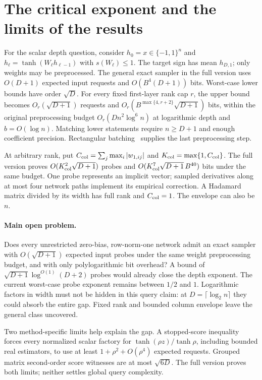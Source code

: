 \documentclass[11pt]{article}
\theoremstyle{definition}\newtheorem{definition}[theorem]{Definition}
\theoremstyle{remark}\newtheorem{remark}[theorem]{Remark}
\numberwithin{equation}{section}
\begin{document}


\section{The critical exponent and the limits of the results}
\label{sec:conf-open}

For the scalar depth question, consider
$h_0=x\in\{-1,1\}^n$ and $h_\ell=\tanh(W_\ell h_{\ell-1})$
with $s(W_\ell)\le1$. The target sign has mean $h_{D,1}$; only weights
may be preprocessed. The general exact sampler in
the full version uses $O(D+1)$ expected input requests and
$O(B^4(D+1))$ bits. Worst-case lower bounds have order $\sqrt D$.
For every fixed first-layer rank cap $r$, the upper bound becomes
$O_r(\sqrt{D+1})$ requests and
$O_r(B^{\max\{4,r+2\}}\sqrt{D+1})$ bits, within the
original preprocessing budget $O_r(Dn^2\log^6 n)$ at logarithmic depth
and $b=O(\log n)$. Matching lower statements require
$n\ge D+1$ and enough coefficient precision.
Rectangular batching~\cite{legall2012rect} supplies the last
preprocessing step.

At arbitrary rank, put $C_{\rm col}=\sum_j\max_i|w_{1,ij}|$ and
$K_{\rm col}=\max\{1,C_{\rm col}\}$. The full version proves
$O(K_{\rm col}^2\sqrt{D+1})$ probes and
$O(K_{\rm col}^7\sqrt{D+1}\,B^{40})$ bits under the same budget.
One probe represents an implicit vector; sampled derivatives along
at most four network paths implement its empirical correction.
A Hadamard matrix divided by its width has full rank and
$C_{\rm col}=1$. The envelope can also be $n$.

\paragraph{Main open problem.}
Does every unrestricted zero-bias, row-norm-one network admit an exact
sampler with $O(\sqrt{D+1})$ expected input probes under the same weight
preprocessing budget, and with only polylogarithmic bit overhead?
A bound of $\sqrt{D+1}\log^{O(1)}(D+2)$ probes would already close
the depth exponent. The current worst-case probe exponent remains
between $1/2$ and $1$. Logarithmic factors in width must not be hidden
in this query claim: at $D=\lceil\log_2n\rceil$ they could absorb the
entire gap. Fixed rank and bounded column envelope leave the
general class uncovered.

Two method-specific limits help explain the gap. A stopped-score
inequality forces every normalized scalar factory for
$\tanh(\rho z)/\tanh\rho$, including bounded real estimators, to use
at least $1+\rho^2+O(\rho^4)$ expected requests. Grouped matrix
second-order score witnesses are at most $\sqrt{6D}$. The full version
proves both limits; neither settles global query complexity.
\end{document}
